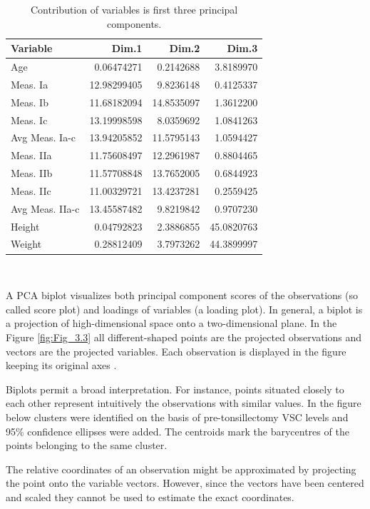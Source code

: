 \documentclass[12pt,a4paper,notitlepage]{report}
\begin{document}
\begin{table}[H]
\centering
	\begin{tabular}{lrrr}
	\hline \textbf{Variable}  & \textbf{Dim.1}	& \textbf{Dim.2} & \textbf{Dim.3}\\
	\hline
	\hline
	Age				&	0.06474271 	 	&	0.2142688  	&	3.8189970\\
	Meas. Ia			&	12.98299405  	&	9.8236148  	&	0.4125337\\
	Meas. Ib			&	11.68182094  	&	14.8535097  	&	1.3612200\\
	Meas. Ic			&	13.19998598  	&	8.0359692  	&	1.0841263\\
	Avg Meas. Ia-c	&	13.94205852  	&	11.5795143  	&	1.0594427\\
	Meas. IIa		&	11.75608497  	&	12.2961987  	&	0.8804465\\
	Meas. IIb		&	11.57708848  	&	13.7652005  	&	0.6844923\\
	Meas. IIc		&	11.00329721  	&	13.4237281  	&	0.2559425\\
	Avg Meas. IIa-c	&	13.45587482  	&	9.8219842  	&	0.9707230\\
	Height			&	0.04792823  		&	2.3886855  	&	45.0820763\\
	Weight			&	0.28812409  		&	3.7973262  	&	44.3899997\\
	\hline
	\end{tabular} \\ 
	\caption{Contribution of variables is first three principal components.}
	\label{tab:Var_coordinates}
\end{table}

\newpage
A PCA biplot visualizes both principal component scores of the observations (so called score plot) and loadings of variables (a loading plot). In general, a biplot is a projection of high-dimensional space onto a two-dimensional plane. In the Figure \ref{fig:Fig_3.3} all different-shaped points are the projected observations and vectors are the projected variables. Each observation is displayed in the figure keeping its original axes \cite{Zhang17}. 

Biplots permit a broad interpretation. For instance, points situated closely to each other represent intuitively the observations with similar values. In the figure below clusters were identified on the basis of pre-tonsillectomy VSC levels and 95\% confidence ellipses were added. The centroids mark the barycentres of the points belonging to the same cluster.

The relative coordinates of an observation might be approximated by projecting the point onto the variable vectors. However, since the vectors have been centered and scaled they cannot be used to estimate the exact coordinates.
\end{document}
